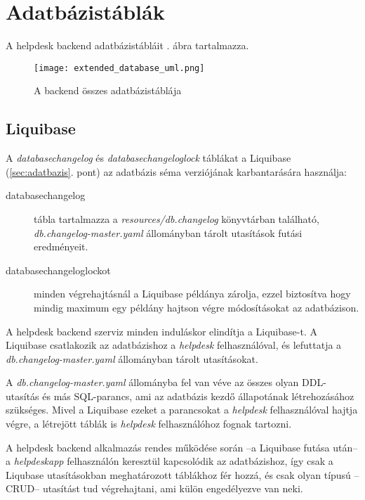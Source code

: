 \section{Adatbázistáblák}
A helpdesk backend adatbázistábláit . ábra tartalmazza.

\begin{figure}[hbt] 
	\centering
	\texttt{[image: extended\_database\_uml.png]}
	\caption{A backend összes adatbázistáblája}
	\label{fig:extended_database_uml}
\end{figure}


\subsection{Liquibase}
A \textit{databasechangelog} és \textit{databasechangeloglock} táblákat a Liquibase (\ref{sec:adatbazis}. pont) az adatbázis séma verziójának karbantarására használja:
\begin{description}
	\item[databasechangelog] tábla tartalmazza a \mbox{\textit{resources/db.changelog}} könyvtárban található,  \mbox{\textit{db.changelog-master.yaml}} állományban tárolt utasítások futási eredményeit.
	
	\item[databasechangeloglockot] minden végrehajtásnál a Liquibase példánya  zárolja, ezzel biztosítva hogy mindig maximum egy példány hajtson végre módosításokat az adatbázison.
\end{description}

A helpdesk backend szerviz minden induláskor elindítja a Liquibase-t. A Liquibase csatlakozik az adatbázishoz a \textit{helpdesk} felhasználóval, és lefuttatja a \mbox{\textit{db.changelog-master.yaml}} állományban tárolt utasításokat.

A \mbox{\textit{db.changelog-master.yaml}} állományba fel van véve az összes olyan DDL-utasítás és más SQL-parancs, ami az adatbázis kezdő állapotának létrehozásához szükséges. Mivel a Liquibase ezeket a parancsokat a \textit{helpdesk} felhasználóval hajtja végre, a létrejött táblák is \textit{helpdesk} felhasználóhoz fognak tartozni. 

A helpdesk backend alkalmazás rendes működése során --a Liquibase futása után-- a \textit{helpdesk\textunderscore app} felhasználón keresztül kapcsolódik az adatbázishoz, így csak a Liqubase utasításokban meghatározott táblákhoz fér hozzá, és csak olyan típusú --CRUD-- utasítást tud végrehajtani, ami külön engedélyezve van neki.

